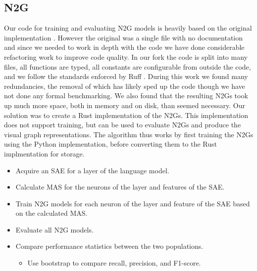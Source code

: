 \documentclass[../main.tex]{subfiles}
\begin{document}
\subsection{N2G}
Our code for training and evaluating N2G models is heavily based on the original implementation .
However the original was a single file with no documentation and since we needed to work in depth with the code we have done considerable refactoring work to improve code quality.
In our fork  the code is split into many files, all functions are typed, all constants are configurable from outside the code, and we follow the standards enforced by Ruff .
During this work we found many redundancies, the removal of which has likely sped up the code though we have not done any formal benchmarking.
We also found that the resulting N2Gs took up much more space, both in memory and on disk, than seemed necessary.
Our solution was to create a Rust implementation of the N2Gs.
This implementation does not support training, but can be used to evaluate N2Gs and produce the visual graph representations.
The algorithm thus works by first training the N2Gs using the Python implementation, before converting them to the Rust implmentation for storage.






\begin{itemize}
    \item Acquire an SAE for a layer of the language model.
    \item Calculate MAS for the neurons of the layer and features of the SAE.
    \item Train N2G models for each neuron of the layer and feature of the SAE based on the calculated MAS.
    \item Evaluate all N2G models.
    \item Compare performance statistics between the two populations.
    \begin{itemize}
        \item Use bootstrap to compare recall, precision, and F1-score.
    \end{itemize}
\end{itemize}

\end{document}
